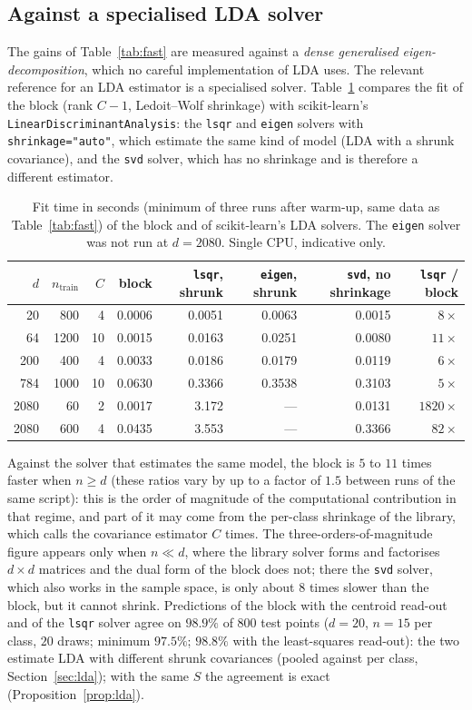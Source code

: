 \documentclass[11pt,a4paper]{article}
\theoremstyle{plain}
\theoremstyle{definition}
\theoremstyle{remark}
\begin{document}
\subsection{Against a specialised LDA solver}
\label{sec:fast-lda}
The gains of Table~\ref{tab:fast} are measured against a \emph{dense
generalised eigen-decomposition}, which no careful implementation of LDA
uses. The relevant reference for an LDA estimator is a specialised solver.
Table~\ref{tab:fast-lda} compares the fit of the block (rank $C-1$,
Ledoit--Wolf shrinkage) with scikit-learn's
\texttt{LinearDiscriminantAnalysis}: the \texttt{lsqr} and \texttt{eigen}
solvers with \texttt{shrinkage="auto"}, which estimate the same kind of
model (LDA with a shrunk covariance), and the \texttt{svd} solver, which
has no shrinkage and is therefore a different estimator.
\begin{table}[h]
\centering\small\renewcommand{\arraystretch}{1.12}
\caption{Fit time in seconds (minimum of three runs after warm-up, same data as Table~\ref{tab:fast}) of the block and of scikit-learn's LDA solvers. The \texttt{eigen} solver was not run at $d=2080$. Single CPU, indicative only.}
\label{tab:fast-lda}
\begin{tabular}{@{}rrr|rrrr|r@{}}
\toprule
$d$ & $n_{\mathrm{train}}$ & $C$ & block & \texttt{lsqr}, shrunk & \texttt{eigen}, shrunk & \texttt{svd}, no shrinkage & \texttt{lsqr} / block \\
\midrule
20 & 800 & 4 & 0.0006 & 0.0051 & 0.0063 & 0.0015 & $8\times$ \\
64 & 1200 & 10 & 0.0015 & 0.0163 & 0.0251 & 0.0080 & $11\times$ \\
200 & 400 & 4 & 0.0033 & 0.0186 & 0.0179 & 0.0119 & $6\times$ \\
784 & 1000 & 10 & 0.0630 & 0.3366 & 0.3538 & 0.3103 & $5\times$ \\
2080 & 60 & 2 & 0.0017 & 3.172 & --- & 0.0131 & $1820\times$ \\
2080 & 600 & 4 & 0.0435 & 3.553 & --- & 0.3366 & $82\times$ \\
\bottomrule
\end{tabular}
\end{table}
Against the solver that estimates the same model, the block is $5$ to $11$
times faster when $n\ge d$ (these ratios vary by up to a factor of $1.5$
between runs of the same script): this is the order of magnitude of the
computational contribution in that regime, and part of it may come from the
per-class shrinkage of the library, which calls the covariance estimator
$C$ times. The three-orders-of-magnitude figure appears only when
$n\ll d$, where the library solver forms and factorises $d\times d$
matrices and the dual form of the block does not; there the \texttt{svd}
solver, which also works in the sample space, is only about $8$ times
slower than the block, but it cannot shrink. Predictions of the block with
the centroid read-out and of the \texttt{lsqr} solver agree on $98.9\%$ of
$800$ test points ($d=20$, $n=15$ per class, $20$ draws; minimum $97.5\%$;
$98.8\%$ with the least-squares read-out): the two estimate LDA with
different shrunk covariances (pooled against per class, Section~\ref{sec:lda});
with the same $S$ the agreement is exact (Proposition~\ref{prop:lda}).
\end{document}
